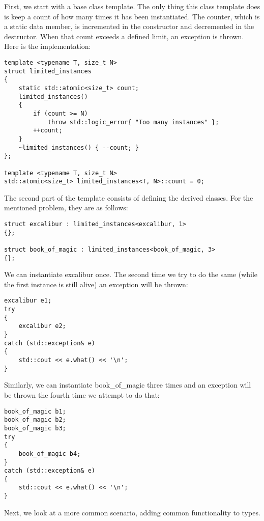 First, we start with a base class template. The only thing this class template does is keep a count of how many times it has been instantiated. The counter, which is a static data member, is incremented in the constructor and decremented in the destructor. When that count exceeds a defined limit, an exception is thrown. Here is the implementation:

\begin{lstlisting}[style=styleCXX]
template <typename T, size_t N>
struct limited_instances
{
	static std::atomic<size_t> count;
	limited_instances()
	{
		if (count >= N)
			throw std::logic_error{ "Too many instances" };
		++count;
	}
	~limited_instances() { --count; }
};

template <typename T, size_t N>
std::atomic<size_t> limited_instances<T, N>::count = 0;
\end{lstlisting}

The second part of the template consists of defining the derived classes. For the mentioned problem, they are as follows:

\begin{lstlisting}[style=styleCXX]
struct excalibur : limited_instances<excalibur, 1>
{};

struct book_of_magic : limited_instances<book_of_magic, 3>
{};
\end{lstlisting}

We can instantiate excalibur once. The second time we try to do the same (while the first instance is still alive) an exception will be thrown:

\begin{lstlisting}[style=styleCXX]
excalibur e1;
try
{
	excalibur e2;
}
catch (std::exception& e)
{
	std::cout << e.what() << '\n';
}
\end{lstlisting}

Similarly, we can instantiate book\_of\_magic three times and an exception will be thrown the fourth time we attempt to do that:

\begin{lstlisting}[style=styleCXX]
book_of_magic b1;
book_of_magic b2;
book_of_magic b3;
try
{
	book_of_magic b4;
}
catch (std::exception& e)
{
	std::cout << e.what() << '\n';
}
\end{lstlisting}

Next, we look at a more common scenario, adding common functionality to types.


